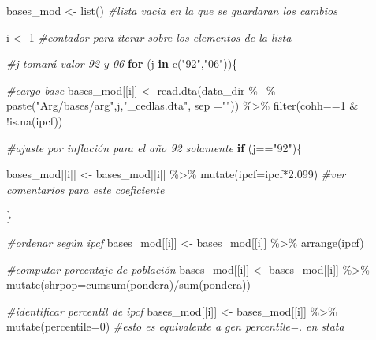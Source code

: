 \documentclass[
]{book}
\newenvironment{Shaded}{\begin{snugshade}}{\end{snugshade}}
\newcommand{\AttributeTok}[1]{\textcolor[rgb]{0.77,0.63,0.00}{#1}}
\newcommand{\CommentTok}[1]{\textcolor[rgb]{0.56,0.35,0.01}{\textit{#1}}}
\newcommand{\ControlFlowTok}[1]{\textcolor[rgb]{0.13,0.29,0.53}{\textbf{#1}}}
\newcommand{\DecValTok}[1]{\textcolor[rgb]{0.00,0.00,0.81}{#1}}
\newcommand{\FloatTok}[1]{\textcolor[rgb]{0.00,0.00,0.81}{#1}}
\newcommand{\FunctionTok}[1]{\textcolor[rgb]{0.00,0.00,0.00}{#1}}
\newcommand{\NormalTok}[1]{#1}
\newcommand{\OtherTok}[1]{\textcolor[rgb]{0.56,0.35,0.01}{#1}}
\newcommand{\SpecialCharTok}[1]{\textcolor[rgb]{0.00,0.00,0.00}{#1}}
\newcommand{\StringTok}[1]{\textcolor[rgb]{0.31,0.60,0.02}{#1}}
\begin{document}
\begin{Shaded}
\begin{Highlighting}[]
\NormalTok{bases\_mod }\OtherTok{\textless{}{-}} \FunctionTok{list}\NormalTok{() }\CommentTok{\#lista vacia en la que se guardaran los cambios}

\NormalTok{i }\OtherTok{\textless{}{-}} \DecValTok{1}              \CommentTok{\#contador para iterar sobre los elementos de la lista}

\CommentTok{\#j tomará valor 92 y 06}
\ControlFlowTok{for}\NormalTok{ (j }\ControlFlowTok{in} \FunctionTok{c}\NormalTok{(}\StringTok{"92"}\NormalTok{,}\StringTok{"06"}\NormalTok{))\{     }
  
  \CommentTok{\#cargo base}
\NormalTok{  bases\_mod[[i]] }\OtherTok{\textless{}{-}} \FunctionTok{read.dta}\NormalTok{(data\_dir }\SpecialCharTok{\%+\%} \FunctionTok{paste}\NormalTok{(}\StringTok{"Arg/bases/arg"}\NormalTok{,j,}\StringTok{"\_cedlas.dta"}\NormalTok{, }\AttributeTok{sep =}\StringTok{""}\NormalTok{)) }\SpecialCharTok{\%\textgreater{}\%} 
                    \FunctionTok{filter}\NormalTok{(cohh}\SpecialCharTok{==}\DecValTok{1} \SpecialCharTok{\&} \SpecialCharTok{!}\FunctionTok{is.na}\NormalTok{(ipcf))}
  
  \CommentTok{\#ajuste por inflación para el año 92 solamente}
  \ControlFlowTok{if}\NormalTok{ (j}\SpecialCharTok{==}\StringTok{"92"}\NormalTok{)\{}
    
\NormalTok{      bases\_mod[[i]] }\OtherTok{\textless{}{-}}\NormalTok{ bases\_mod[[i]] }\SpecialCharTok{\%\textgreater{}\%} \FunctionTok{mutate}\NormalTok{(}\AttributeTok{ipcf=}\NormalTok{ipcf}\SpecialCharTok{*}\FloatTok{2.099}\NormalTok{)   }\CommentTok{\#ver comentarios para este coeficiente}
    
\NormalTok{  \}}
  
  \CommentTok{\#ordenar según ipcf}
\NormalTok{  bases\_mod[[i]] }\OtherTok{\textless{}{-}}\NormalTok{ bases\_mod[[i]] }\SpecialCharTok{\%\textgreater{}\%} \FunctionTok{arrange}\NormalTok{(ipcf)}
  
  \CommentTok{\#computar porcentaje de población}
\NormalTok{  bases\_mod[[i]] }\OtherTok{\textless{}{-}}\NormalTok{ bases\_mod[[i]] }\SpecialCharTok{\%\textgreater{}\%} \FunctionTok{mutate}\NormalTok{(}\AttributeTok{shrpop=}\FunctionTok{cumsum}\NormalTok{(pondera)}\SpecialCharTok{/}\FunctionTok{sum}\NormalTok{(pondera))}
  
  \CommentTok{\#identificar percentil de ipcf}
\NormalTok{  bases\_mod[[i]] }\OtherTok{\textless{}{-}}\NormalTok{ bases\_mod[[i]] }\SpecialCharTok{\%\textgreater{}\%} \FunctionTok{mutate}\NormalTok{(}\AttributeTok{percentile=}\DecValTok{0}\NormalTok{)  }\CommentTok{\#esto es equivalente a gen percentile=. en stata}
   

\end{Highlighting}
\end{Shaded}
\end{document}
